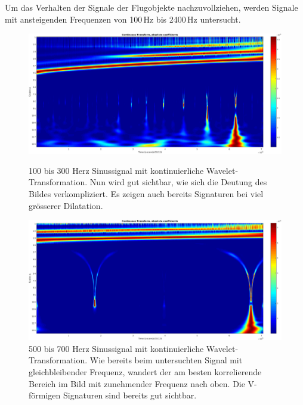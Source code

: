\begin{refsection}
Um das Verhalten der Signale der Flugobjekte nachzuvollziehen, werden Signale mit ansteigenden Frequenzen von 100\,Hz bis 2400\,Hz untersucht.
\begin{figure}
	\centering
	\includegraphics[width=1.0\linewidth]{papers/meteor/images/anomalie/sweep/cwt_0100to0300hz-clipped.png}
	\caption{100 bis 300 Herz Sinussignal mit kontinuierliche Wavelet-Transformation.
	Nun wird gut sichtbar, wie sich die Deutung des Bildes verkompliziert. 
	Es zeigen auch bereits Signaturen bei viel grösserer Dilatation.}
	\includegraphics[width=1.0\linewidth]{papers/meteor/images/anomalie/sweep/cwt_0500to0700hz-clipped.png}
	\caption{500 bis 700 Herz Sinussignal mit kontinuierliche Wavelet-Transformation.
	Wie bereits beim untersuchten Signal mit gleichbleibender Frequenz, wandert der am besten korrelierende Bereich im Bild mit zunehmender Frequenz nach oben.
	Die V-förmigen Signaturen sind bereits gut sichtbar.}
	\label{fig:cwt_anomalie_beam_1}
\end{figure}


\end{refsection}
